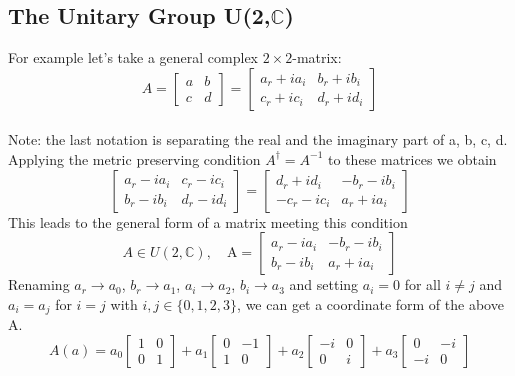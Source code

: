 \documentclass[11pt, oneside]{article}   	%
\begin{document}
\subsection{The Unitary Group U(2,$\mathbb{C}$)}
For example let's take a general complex $2\times2$-matrix:
\begin{equation} A =
\begin{bmatrix}
	a & b \\
	c & d
\end{bmatrix} =
\begin{bmatrix}
	a_r + ia_i & b_r + ib_i \\
	c_r + ic_i & d_r + id_i
\end{bmatrix}
\end{equation} \\
Note: the last notation is separating the real and the imaginary part of a, b, c, d.
\pagebreak
\\
Applying the metric preserving condition $A^\dagger = A^{-1}$ to these matrices we obtain
\begin{equation} 
\begin{bmatrix}
	a_r - ia_i & c_r - ic_i \\
	b_r - ib_i & d_r - id_i
\end{bmatrix} =
\begin{bmatrix}
	 d_r + id_i & -b_r - ib_i \\
	-c_r - ic_i &  a_r + ia_i
\end{bmatrix}
\end{equation}
%
This leads to the general form of a matrix meeting this condition 
\begin{equation} A \in U(2,\mathbb{C}), \quad \text{A} = 
\begin{bmatrix}
	a_r - ia_i & -b_r - ib_i \\
	b_r - ib_i &  a_r + ia_i
\end{bmatrix}
\end{equation}
%
Renaming $a_r \rightarrow a_0$, $b_r \rightarrow a_1$, $a_i \rightarrow a_2$, $b_i \rightarrow a_3$ and setting $a_i = 0$ for all $i\neq j$ and $a_i = a_j$ for $i = j$ with $i,j \in \{0,1,2,3\}$, we can get a coordinate form of the above A.
%
%
\begin{equation}
A(a) = a_{0}
\begin{bmatrix}
	1 & 0 \\
	0 & 1
\end{bmatrix}
+a_{1}
\begin{bmatrix}
	0 & -1 \\
	1 & 0
\end{bmatrix}
+a_{2}
\begin{bmatrix}
	-i & 0 \\
	0 & i
\end{bmatrix}
+a_{3}
\begin{bmatrix}
	0 & -i \\
	-i & 0
\end{bmatrix}
\end{equation}
\end{document}
